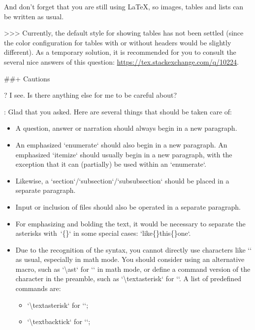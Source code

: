 \documentclass[%
  use style = classical,
  scroll,
]{Q-and-A}
\begin{document}
  \medskip

  And don't forget that you are still using \LaTeX, so images, tables and lists can be written as usual.

  \medskip

  >>> Currently, the default style for showing tables has not been settled (since the color configuration for tables with or without headers would be slightly different). As a temporary solution, it is recommended for you to consult the several nice answers of this question: \url{https://tex.stackexchange.com/q/10224}.


##+ {Cautions}

?
  I see. Is there anything else for me to be careful about?

:
  Glad that you asked. Here are several things that should be taken care of:
  \begin{itemize}
    \item A question, answer or narration should always begin in a new paragraph.
    \item An emphasized `enumerate` should also begin in a new paragraph. An emphasized `itemize` should usually begin in a new paragraph, with the exception that it can (partially) be used within an `enumerate`.
    \item Likewise, a `section`/`subsection`/`subsubsection` should be placed in a separate paragraph.
    \item Input or inclusion of files should also be operated in a separate paragraph.
    \item For emphasizing and bolding the text, it would be necessary to separate the asterisks with~`\{\}` in some special cases: `\textasterisk\textasterisk like\textasterisk\textasterisk\{\}\textasterisk\textasterisk\textasterisk this\textasterisk\textasterisk\textasterisk\{\}\textasterisk one\textasterisk`.
    \item Due to the recognition of the syntax, you cannot directly use characters like `\textasterisk` as usual, especially in math mode. You should consider using an alternative macro, such as `\textbackslash ast` for `\textasterisk` in math mode, or define a command version of the character in the preamble, such as `\textbackslash textasterisk` for `\textasterisk`. A list of predefined commands are:
    \begin{itemize}
      \item `\textbackslash textasterisk` for `\textasterisk`;
      \item `\textbackslash textbacktick` for `\textbacktick`;

\end{itemize}
\end{itemize}
\end{document}
